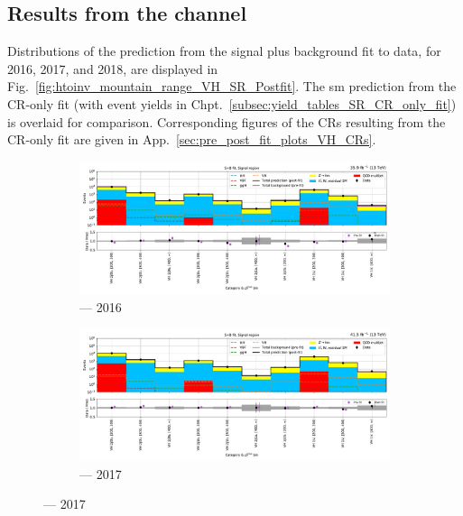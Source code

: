 \subsection{Results from the \texorpdfstring{\VH}{VH} channel}
\label{subsec:htoinv_results_VH}

Distributions of the prediction from the signal plus background fit to data, for 2016, 2017, and 2018, are displayed in Fig.~\ref{fig:htoinv_mountain_range_VH_SR_Postfit}. The \acrshort{sm} prediction from the \gls{CR}-only fit (with event yields in Chpt.~\ref{subsec:yield_tables_SR_CR_only_fit}) is overlaid for comparison. Corresponding figures of the \glspl{CR} resulting from the \gls{CR}-only fit are given in App.~\ref{sec:pre_post_fit_plots_VH_CRs}.

\begin{figure}[htbp]
    \centering
    \begin{subfigure}[b]{0.9\textwidth}
        \includegraphics[width=\textwidth]{figures/mountain_ranges/2016/VH/SR_tree_fit_s-abs_values_VH_cats.pdf}
        \caption{\VH --- 2016}
    \end{subfigure}

    \begin{subfigure}[b]{0.9\textwidth}
        \includegraphics[width=\textwidth]{figures/mountain_ranges/2017/VH/SR_tree_fit_s-abs_values_VH_cats.pdf}
        \caption{\VH --- 2017}
    \end{subfigure}


\end{figure}
